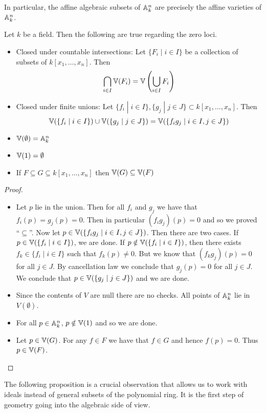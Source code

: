 \documentclass[a4paper]{article}
\begin{document}
In particular, the affine algebraic subsets of $\mathbb{A}_k^n$ are precisely the affine varieties of $\mathbb{A}_k^n$. 

\begin{prp}{}{} Let $k$ be a field. Then the following are true regarding the zero loci. 
\begin{itemize}
\item Closed under countable intersections: Let $\{F_i\;|\;i\in I\}$ be a collection of subsets of $k[x_1,\dots,x_n]$. Then $$\bigcap_{i\in I}\mathbb{V}(F_i)=\mathbb{V}\left(\bigcup_{i\in I}F_i\right)$$
\item Closed under finite unions: Let $\{f_i\;|\;i\in I\},\{g_j\;|\;j\in J\}\subset k[x_1,\dots,x_n]$. Then $$\mathbb{V}(\{f_i\;|\;i\in I\})\cup\mathbb{V}(\{g_j\;|\;j\in J\})=\mathbb{V}(\{f_ig_j\;|\;i\in I, j\in J\})$$
\item $\mathbb{V}(\emptyset)=\mathbb{A}_k^n$
\item $\mathbb{V}(1)=\emptyset$
\item If $F\subseteq G\subseteq k[x_1,\dots,x_n]$ then $\mathbb{V}(G)\subseteq\mathbb{V}(F)$
\end{itemize}\tcbline
\begin{proof}~\\
\begin{itemize}
\item Let $p$ lie in the union. Then for all $f_i$ and $g_j$ we have that $f_i(p)=g_j(p)=0$. Then in particular $(f_ig_j)(p)=0$ and so we proved ``$\subseteq$''. Now let $p\in\mathbb{V}(\{f_ig_j\;|\;i\in I, j\in J\})$. Then there are two cases. If $p\in\mathbb{V}(\{f_i\;|\;i\in I\})$, we are done. If $p\notin\mathbb{V}(\{f_i\;|\;i\in I\})$, then there exists $f_k\in\{f_i\;|\;i\in I\}$ such that $f_k(p)\neq 0$. But we know that $(f_kg_j)(p)=0$ for all $j\in J$. By cancellation law we conclude that $g_j(p)=0$ for all $j\in J$. We conclude that $p\in\mathbb{V}(\{g_j\;|\;j\in J\})$ and we are done. 
\item Since the contents of $V$ are null there are no checks. All points of $\mathbb{A}_k^n$ lie in $V(\emptyset)$. 
\item For all $p\in\mathbb{A}_k^n$, $p\notin\mathbb{V}(1)$ and so we are done. 
\item Let $p\in\mathbb{V}(G)$. For any $f\in F$ we have that $f\in G$ and hence $f(p)=0$. Thus $p\in\mathbb{V}(F)$. 
\end{itemize}
\end{proof}
\end{prp}

The following proposition is a crucial observation that allows us to work with ideals instead of general subsets of the polynomial ring. It is the first step of geometry going into the algebraic side of view. 
\end{document}
